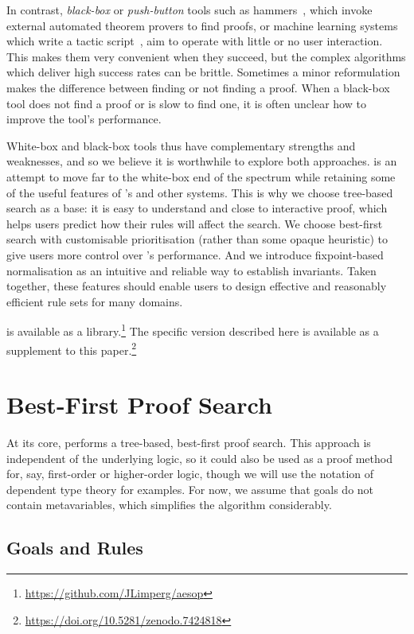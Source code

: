 In contrast, \emph{black-box} or \emph{push-button} tools such as
hammers~\cite{Blanchette16}, which invoke external automated theorem provers to
find proofs, or machine learning systems which write a tactic
script~\cite{Bansal19,TacticToe,Han21,Lample22}, aim to operate with little or
no user interaction. This makes them very convenient when they succeed, but the
complex algorithms which deliver high success rates can be brittle. Sometimes a
minor reformulation makes the difference between finding or not finding a proof.
When a black-box tool does not find a proof or is slow to find one, it is often
unclear how to improve the tool's performance.

White-box and black-box tools thus have complementary strengths and weaknesses,
and so we believe it is worthwhile to explore both approaches. \Aesop{} is an
attempt to move far to the white-box end of the spectrum while retaining some of
the useful features of \Isabelle's \auto{} and other systems. This is why we
choose tree-based search as a base: it is easy to understand and close to
interactive proof, which helps users predict how their rules will affect the
search. We choose best-first search with customisable prioritisation (rather
than some opaque heuristic) to give users more control over \Aesop's
performance. And we introduce fixpoint-based normalisation as an intuitive and
reliable way to establish invariants. Taken together, these features should
enable users to design effective and reasonably efficient rule sets for many
domains.

\Aesop{} is available as a \Leanfour{}
library.\footnote{\url{https://github.com/JLimperg/aesop}} The specific version
described here is available as a supplement to this
paper.\footnote{\url{https://doi.org/10.5281/zenodo.7424818}}


\section{Best-First Proof Search}%
\label{sec:abstract-framework}

At its core, \Aesop{} performs a tree-based, best-first proof search. This
approach is independent of the underlying logic, so it could also be used as a
proof method for, say, first-order or higher-order logic, though we will use the
notation of dependent type theory for examples. For now, we assume that goals do
not contain metavariables, which simplifies the algorithm considerably.


\subsection{Goals and Rules}%
\label{sec:goals-rules}

